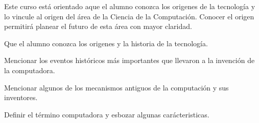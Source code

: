\begin{syllabus}


\begin{justification}
Este curso está orientado aque el alumno conozca los origenes de la tecnología y lo vincule al origen del área de la Ciencia de la Computación. Conocer el origen permitirá planear el futuro de esta área con mayor claridad.
\end{justification}

\begin{goals}
\item Que el alumno conozca los origenes y la historia de la tecnología.
\item Mencionar los eventos históricos más importantes que llevaron a la invención de la computadora.
\item Mencionar algunos de los mecanismos antiguos de la computación y sus inventores.
\item Definir el término computadora y esbozar algunas carácteristicas.
\end{goals}


\end{syllabus}
